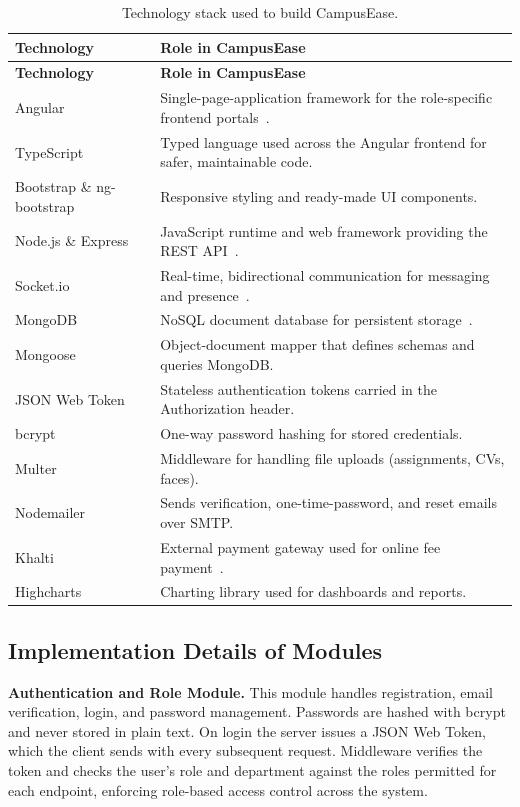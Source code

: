 \documentclass[12pt,a4paper]{report}
\begin{document}
\begin{longtable}{|p{3.4cm}|p{10.1cm}|}
\caption{Technology stack used to build CampusEase.}
\label{tab:techstack}\\
\hline
\textbf{Technology} & \textbf{Role in CampusEase} \\
\hline
\endfirsthead
\hline
\textbf{Technology} & \textbf{Role in CampusEase} \\
\hline
\endhead
Angular & Single-page-application framework for the role-specific frontend portals~\cite{angular}. \\
\hline
TypeScript & Typed language used across the Angular frontend for safer, maintainable code. \\
\hline
Bootstrap \& ng-bootstrap & Responsive styling and ready-made UI components. \\
\hline
Node.js \& Express & JavaScript runtime and web framework providing the REST API~\cite{express}. \\
\hline
Socket.io & Real-time, bidirectional communication for messaging and presence~\cite{socketio}. \\
\hline
MongoDB & NoSQL document database for persistent storage~\cite{mongodb}. \\
\hline
Mongoose & Object-document mapper that defines schemas and queries MongoDB. \\
\hline
JSON Web Token & Stateless authentication tokens carried in the Authorization header. \\
\hline
bcrypt & One-way password hashing for stored credentials. \\
\hline
Multer & Middleware for handling file uploads (assignments, CVs, faces). \\
\hline
Nodemailer & Sends verification, one-time-password, and reset emails over SMTP. \\
\hline
Khalti & External payment gateway used for online fee payment~\cite{khalti}. \\
\hline
Highcharts & Charting library used for dashboards and reports. \\
\hline
\end{longtable}

\subsection{Implementation Details of Modules}

\textbf{Authentication and Role Module.}
This module handles registration, email verification, login, and password management. Passwords are hashed with bcrypt and never stored in plain text. On login the server issues a JSON Web Token, which the client sends with every subsequent request. Middleware verifies the token and checks the user's role and department against the roles permitted for each endpoint, enforcing role-based access control across the system.
\end{document}
